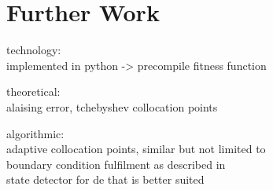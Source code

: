 \documentclass[./\jobname.tex]{subfiles}
\begin{document}
\chapter{Further Work}
technology: \\
implemented in python -> precompile fitness function

theoretical:\\
alaising error, tchebyshev collocation points

algorithmic:\\
adaptive collocation points, similar but not limited to \cite{howard_genetic_2011} \\
boundary condition fulfilment as described in \cite{sobester_genetic_2008} \\
state detector for \gls{de} that is better suited \\
\end{document}
